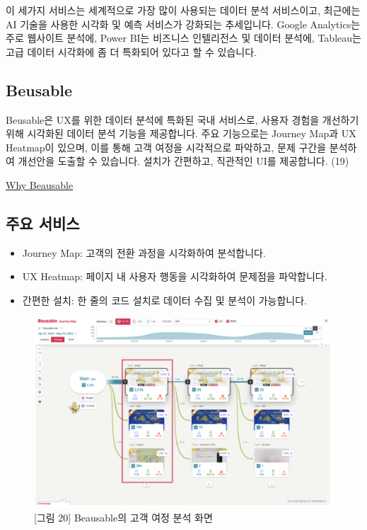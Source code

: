\documentclass[
  letterpaper,
]{book}
\providecommand{\tightlist}{%
  \setlength{\itemsep}{0pt}\setlength{\parskip}{0pt}}\usepackage{longtable,booktabs,array}
\begin{document}
이 세가지 서비스는 세계적으로 가장 많이 사용되는 데이터 분석 서비스이고,
최근에는 AI 기술을 사용한 시각화 및 예측 서비스가 강화되는 추세입니다.
Google Analytics는 주로 웹사이트 분석에, Power BI는 비즈니스 인텔리전스
및 데이터 분석에, Tableau는 고급 데이터 시각화에 좀 더 특화되어 있다고
할 수 있습니다.

\subsection{Beusable}\label{beusable}

Beusable은 UX를 위한 데이터 분석에 특화된 국내 서비스로, 사용자 경험을
개선하기 위해 시각화된 데이터 분석 기능을 제공합니다. 주요 기능으로는
Journey Map과 UX Heatmap이 있으며, 이를 통해 고객 여정을 시각적으로
파악하고, 문제 구간을 분석하여 개선안을 도출할 수 있습니다. 설치가
간편하고, 직관적인 UI를 제공합니다. (19)

\href{https://www.beusable.net/ko/}{Why Beausable}

\subsection{주요 서비스}\label{uxc8fcuxc694-uxc11cuxbe44uxc2a4-3}

\begin{itemize}
\tightlist
\item
  Journey Map: 고객의 전환 과정을 시각화하여 분석합니다.
\item
  UX Heatmap: 페이지 내 사용자 행동을 시각화하여 문제점을 파악합니다.
\item
  간편한 설치: 한 줄의 코드 설치로 데이터 수집 및 분석이 가능합니다.
\end{itemize}

\begin{figure}[H]

{\centering \includegraphics{img/fig20.png}

}

\caption{{[}그림 20{]} Beausable의 고객 여정 분석 화면}

\end{figure}%
\end{document}
